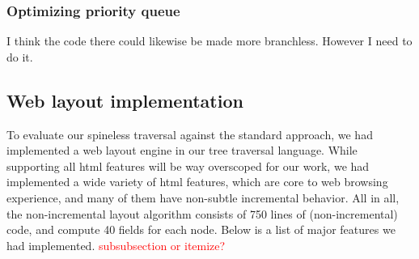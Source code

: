 \documentclass[format=acmsmall, review=false, screen=true]{acmart}
\newcommand\todo[1]{\textcolor{red}{#1}}
\begin{document}
\subsubsection{Optimizing priority queue}
I think the code there could likewise be made more branchless. However I need to do it.
\subsection{Web layout implementation}
To evaluate our spineless traversal against the standard approach, we had implemented a web layout engine in our tree traversal language. While supporting all html features will be way overscoped for our work, we had implemented a wide variety of html features, which are core to web browsing experience, and many of them have non-subtle incremental behavior. All in all, the non-incremental layout algorithm consists of 750 lines of (non-incremental) code, and compute 40 fields for each node. Below is a list of major features we had implemented.
\todo{subsubsection or itemize?}
\end{document}

